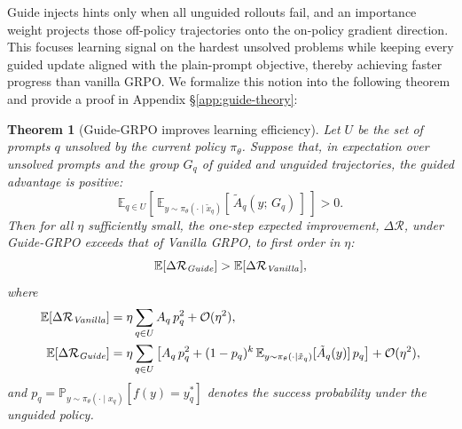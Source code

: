 \documentclass{article}
\newtheorem{theorem}{Theorem}
\begin{document}
\vspace{-1em}
Guide injects hints only when all unguided rollouts
fail, and an importance weight projects those off-policy trajectories
onto the on-policy gradient direction.  
This focuses learning signal on the hardest unsolved problems while
keeping every guided update aligned with the plain-prompt
objective, thereby achieving faster progress than
vanilla GRPO. We formalize this notion into the following theorem and provide a proof in Appendix \S\ref{app:guide-theory}:

\begin{theorem}[Guide-GRPO improves learning efficiency]
\label{thm:guide_better}
Let \(U\) be the set of prompts \(q\) unsolved by the current policy \(\pi_\theta\). Suppose that, in expectation over unsolved prompts and the group $G_q$ of guided and unguided trajectories, the guided advantage is positive:
\[
\mathbb{E}_{q \in U} \left[\, \mathbb{E}_{y \sim \pi_\theta(\cdot \mid \tilde{x}_q)} \left[\, \tilde{A}_q(y;\, G_q) \,\right] \,\right] > 0.
\]
Then for all \(\eta\) sufficiently small, the one-step expected improvement, \(\Delta \mathcal{R}\), under Guide-GRPO exceeds that of Vanilla GRPO, to first order in \(\eta\):
\vspace{0.5em}
\begin{equation}
\mathbb{E}[\Delta\mathcal{R}_{\text{\emph{Guide}}}] > \mathbb{E}[\Delta\mathcal{R}_{\text{\emph{Vanilla}}}],
\end{equation}
\vspace{0.25em}
where
\begin{align}
\mathbb{E}[\Delta\mathcal{R}_{\text{\emph{Vanilla}}}] &= \eta \sum_{q \in U} A_q\, p_q^2 + \mathcal{O}(\eta^2), \\
\mathbb{E}[\Delta\mathcal{R}_{\text{\emph{Guide}}}] &= \eta \sum_{q \in U} \left[ A_q\, p_q^2 + (1 - p_q)^k\, \mathbb{E}_{y \sim \pi_\theta(\cdot \mid \tilde x_q)}[\tilde A_q(y)]\, p_q \right] + \mathcal{O}(\eta^2),
\end{align}
and \(p_q = \mathbb{P}_{y \sim \pi_\theta(\cdot \mid x_q)}\left[f(y) = y_q^*\right]\) denotes the success probability under the unguided policy.
\end{theorem}
\end{document}
